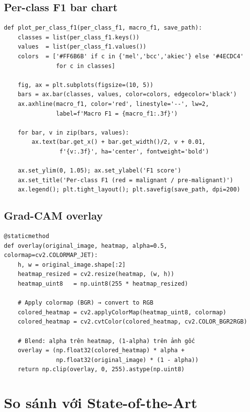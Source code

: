 \documentclass[11pt,a4paper]{article}
\begin{document}
\subsection{Per-class F1 bar chart}

\begin{lstlisting}[caption={Per-class F1 + macro line}]
def plot_per_class_f1(per_class_f1, macro_f1, save_path):
    classes = list(per_class_f1.keys())
    values  = list(per_class_f1.values())
    colors  = ['#FF6B6B' if c in {'mel','bcc','akiec'} else '#4ECDC4'
               for c in classes]

    fig, ax = plt.subplots(figsize=(10, 5))
    bars = ax.bar(classes, values, color=colors, edgecolor='black')
    ax.axhline(macro_f1, color='red', linestyle='--', lw=2,
               label=f'Macro F1 = {macro_f1:.3f}')

    for bar, v in zip(bars, values):
        ax.text(bar.get_x() + bar.get_width()/2, v + 0.01,
                f'{v:.3f}', ha='center', fontweight='bold')

    ax.set_ylim(0, 1.05); ax.set_ylabel('F1 score')
    ax.set_title('Per-class F1 (red = malignant / pre-malignant)')
    ax.legend(); plt.tight_layout(); plt.savefig(save_path, dpi=200)
\end{lstlisting}

\subsection{Grad-CAM overlay}

\begin{lstlisting}[caption={Overlay heatmap lên ảnh gốc}]
@staticmethod
def overlay(original_image, heatmap, alpha=0.5, colormap=cv2.COLORMAP_JET):
    h, w = original_image.shape[:2]
    heatmap_resized = cv2.resize(heatmap, (w, h))
    heatmap_uint8   = np.uint8(255 * heatmap_resized)

    # Apply colormap (BGR) → convert to RGB
    colored_heatmap = cv2.applyColorMap(heatmap_uint8, colormap)
    colored_heatmap = cv2.cvtColor(colored_heatmap, cv2.COLOR_BGR2RGB)

    # Blend: alpha trên heatmap, (1-alpha) trên ảnh gốc
    overlay = (np.float32(colored_heatmap) * alpha +
               np.float32(original_image) * (1 - alpha))
    return np.clip(overlay, 0, 255).astype(np.uint8)
\end{lstlisting}

\section{So sánh với State-of-the-Art}
\end{document}
